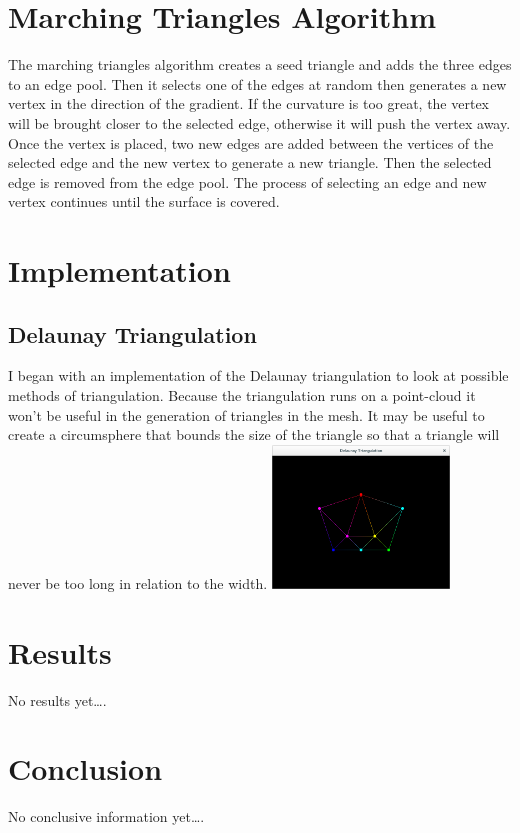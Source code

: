 \documentclass[conference]{acmsiggraph}
\begin{document}
\section{Marching Triangles Algorithm}
The marching triangles algorithm creates a seed triangle and adds the three
edges to an edge pool. Then it selects one of the edges at random then
generates a new vertex in the direction of the gradient. If the curvature is
too great, the vertex will be brought closer to the selected edge, otherwise it
will push the vertex away. Once the vertex is placed, two new edges are added
between the vertices of the selected edge and the new vertex to generate a new
triangle. Then the selected edge is removed from the edge pool. The process of
selecting an edge and new vertex continues until the surface is covered.

\section {Implementation}

\subsection{Delaunay Triangulation}
I began with an implementation of the Delaunay triangulation to look at
possible methods of triangulation. Because the triangulation runs on a
point-cloud it won't be useful in the generation of triangles in the mesh. It
may be useful to create a circumsphere that bounds the size of the triangle so
that a triangle will never be too long in relation to the width.
\includegraphics[height=1.5in]{images/Triangulated.png}

\section{Results}
No results yet\ldots.

\section{Conclusion}
No conclusive information yet\ldots.


\nocite{*}

\end{document}
